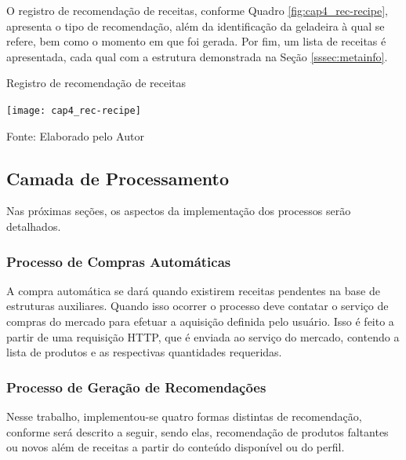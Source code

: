 
O registro de recomendação de receitas, conforme Quadro \ref{fig:cap4_rec-recipe}, apresenta o tipo de recomendação, além da identificação da geladeira à qual se refere, bem como o momento em que foi gerada. Por fim, um lista de receitas é apresentada, cada qual com a estrutura demonstrada na Seção \ref{sssec:metainfo}.

\begin{quadro}[htb]
    \caption{Registro de recomendação de receitas}
    \label{fig:cap4_rec-recipe}
    \texttt{[image: cap4\_rec-recipe]}
    
    \footnotesize{Fonte: Elaborado pelo Autor}
\end{quadro}


\subsection{Camada de Processamento}

Nas próximas seções, os aspectos da implementação dos processos serão detalhados.

\ProximoForaDoSumario 
\subsubsection{Processo de Compras Automáticas}

A compra automática se dará quando existirem receitas pendentes na base de estruturas auxiliares. Quando isso ocorrer o processo deve contatar o serviço de compras do mercado para efetuar a aquisição definida pelo usuário. Isso é feito a partir de uma requisição HTTP, que é enviada ao serviço do mercado, contendo a lista de produtos e as respectivas quantidades requeridas.

\ProximoForaDoSumario 
\subsubsection{Processo de Geração de Recomendações} \label{sssec:proc_ger_rec}

Nesse trabalho, implementou-se quatro formas distintas de recomendação, conforme será descrito a seguir, sendo elas, recomendação de produtos faltantes ou novos além de receitas a partir do conteúdo disponível ou do perfil.

